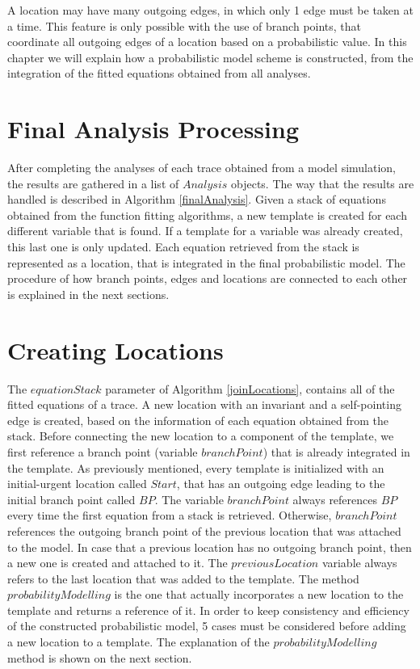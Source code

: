 %
A location may have many outgoing edges, in which only 1 edge must be taken at a time. 
%
This feature is only possible with the use of branch points, that coordinate all outgoing edges of a location based on a probabilistic value.
%
%
In this chapter we will explain how a probabilistic model scheme is constructed, from the integration of the fitted equations obtained from all analyses.

\section{Final Analysis Processing}
%
After completing the analyses of each trace obtained from a model simulation, the results are gathered in a list of $Analysis$ objects. 
%
The way that the results are handled is described in Algorithm \ref{finalAnalysis}. 
%
Given a stack of equations obtained from the function fitting algorithms, a new template is created for each different variable that is found.
%
If a template for a variable was already created, this last one is only updated.
%
Each equation retrieved from the stack is represented as a location, that is integrated in the final probabilistic model. 
%
The procedure of how branch points, edges and locations are connected to each other is explained in the next sections. 
%



\section{Creating Locations}
The $equationStack$ parameter of Algorithm \ref{joinLocations}, contains all of the fitted equations of a trace.
%
A new location with an invariant and a self-pointing edge is created, based on the information of each equation obtained from the stack.
%
Before connecting the new location to a component of the template, we first reference a branch point (variable $branchPoint$) that is already integrated in the template.
%
As previously mentioned, every template is initialized with an initial-urgent location called $Start$, that has an outgoing edge leading to the initial branch point called $BP$. 
%
The variable $branchPoint$ always references $BP$ every time the first equation from a stack is retrieved.
%
Otherwise, $branchPoint$ references the outgoing branch point of the previous location that was attached to the model. 
%
In case that a previous location has no outgoing branch point, then a new one is created and attached to it.
%
The $previousLocation$ variable always refers to the last location that was added to the template.
%
The method $probabilityModelling$ is the one that actually incorporates a new location to the template and returns a reference of it. 
%
In order to keep consistency and efficiency of the constructed probabilistic model, 5 cases must be considered before adding a new location to a template. 
%
The explanation of the $probabilityModelling$ method is shown on the next section. 

